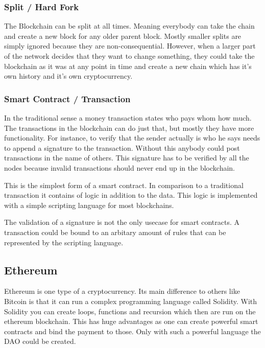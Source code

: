\documentclass[a4paper, 11pt]{scrartcl}
\begin{document}
\subsubsection{Split / Hard Fork}

The Blockchain can be split at all times. Meaning everybody can take the chain and create a new block for any older parent block. Mostly smaller splits are simply ignored because they are non-consequential. However, when a larger part of the network decides that they want to change something, they could take the blockchain as it was at any point in time and create a new chain which has it's own history and it's own cryptocurrency. \cite{blockchainKai}

\subsubsection{Smart Contract / Transaction}

In the traditional sense a money transaction states who pays whom how much. The transactions in the blockchain can do just that, but mostly they have more functionality. For instance, to verify that the sender actually is who he says needs to append a signature to the transaction. Without this anybody could post transactions in the name of others. This signature has to be verified by all the nodes because invalid transactions should never end up in the blockchain. \cite{blockchainKai}

This is the simplest form of a smart contract. In comparison to a traditional transaction it contains of logic in addition to the data. This logic is implemented with a simple scripting language for most blockchains. \cite{blockchainKai} 

The validation of a signature is not the only usecase for smart contracts. A transaction could be bound to an arbitary amount of rules that can be represented by the scripting language. \cite{blockchainKai}

\subsection{Ethereum}

Ethereum is one type of a cryptocurrency. Its main difference to others like Bitcoin is that it can run a complex programming language called Solidity. With Solidity you can create loops, functions and recursion which then are run on the ethereum blockchain. This has huge advantages as one can create powerful smart contracts and bind the payment to those. Only with such a powerful language the DAO could be created. \cite{eth}
\end{document}
